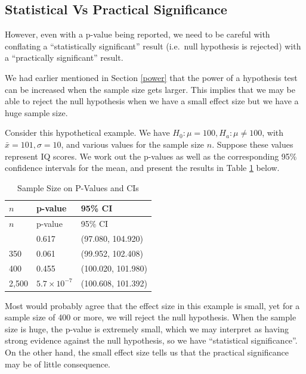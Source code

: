 \documentclass[
]{book}
\begin{document}
\hypertarget{statistical-vs-practical-significance}{%
\subsection{Statistical Vs Practical Significance}\label{statistical-vs-practical-significance}}

However, even with a p-value being reported, we need to be careful with conflating a ``statistically significant'' result (i.e.~null hypothesis is rejected) with a ``practically significant'' result.

We had earlier mentioned in Section \ref{power} that the power of a hypothesis test can be increased when the sample size gets larger. This implies that we may be able to reject the null hypothesis when we have a small effect size but we have a huge sample size.

Consider this hypothetical example. We have \(H_0: \mu = 100, H_a: \mu \neq 100\), with \(\bar{x} = 101, \sigma=10\), and various values for the sample size \(n\). Suppose these values represent IQ scores. We work out the p-values as well as the corresponding 95\% confidence intervals for the mean, and present the results in Table \ref{tab:practical} below.

\begin{longtable}[]{@{}lll@{}}
\caption{\label{tab:practical} Sample Size on P-Values and CIs}\tabularnewline
\toprule\noalign{}
\(n\) & p-value & 95\% CI \\
\midrule\noalign{}
\endfirsthead
\toprule\noalign{}
\(n\) & p-value & 95\% CI \\
\midrule\noalign{}
\endhead
\bottomrule\noalign{}
\endlastfoot
25 & 0.617 & (97.080, 104.920) \\
350 & 0.061 & (99.952, 102.408) \\
400 & 0.455 & (100.020, 101.980) \\
2,500 & \(5.7 \times 10^{-7}\) & (100.608, 101.392) \\
\end{longtable}

Most would probably agree that the effect size in this example is small, yet for a sample size of 400 or more, we will reject the null hypothesis. When the sample size is huge, the p-value is extremely small, which we may interpret as having strong evidence against the null hypothesis, so we have ``statistical significance''. On the other hand, the small effect size tells us that the practical significance may be of little consequence.
\end{document}
